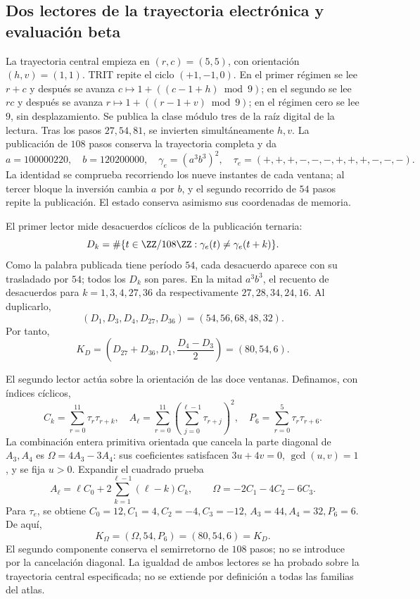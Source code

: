 \subsection{Dos lectores de la trayectoria electrónica y evaluación beta}
\label{vi:dep:beta}

La trayectoria central empieza en \((r,c)=(5,5)\), con
orientación \((h,v)=(1,1)\). TRIT repite el ciclo \((+1,-1,0)\).
En el primer régimen se lee \(r+c\) y después se avanza
\(c\mapsto1+((c-1+h)\bmod9)\); en el segundo se lee \(rc\) y
después se avanza \(r\mapsto1+((r-1+v)\bmod9)\); en el régimen
cero se lee \(9\), sin desplazamiento. Se publica la clase módulo
tres de la raíz digital de la lectura. Tras los pasos \(27,54,81\),
se invierten simultáneamente \(h,v\). La publicación de \(108\)
pasos conserva la trayectoria completa y da
\begin{equation}
 a=100000220,\quad b=120200000,\quad
 \gamma_e=(a^3b^3)^2,
 \quad\tau_e=(+,+,+,-,-,-,+,+,+,-,-,-).
 \label{vi:dep:trayectoria-electron}
\end{equation}
La identidad se comprueba recorriendo los nueve instantes de cada
ventana; al tercer bloque la inversión cambia \(a\) por \(b\),
y el segundo recorrido de \(54\) pasos repite la publicación.
El estado conserva asimismo sus coordenadas de memoria.

El primer lector mide desacuerdos cíclicos de la publicación ternaria:
\[
 D_k=\#\{t\in\ZZ/108\ZZ:\gamma_e(t)\ne\gamma_e(t+k)\}.
\]
Como la palabra publicada tiene período \(54\), cada desacuerdo
aparece con su trasladado por \(54\); todos los \(D_k\) son pares.
En la mitad \(a^3b^3\), el recuento de desacuerdos para
\(k=1,3,4,27,36\) da respectivamente \(27,28,34,24,16\).
Al duplicarlo,
\[
 (D_1,D_3,D_4,D_{27},D_{36})=(54,56,68,48,32).
\]
Por tanto,
\begin{equation}
 K_D=\left(D_{27}+D_{36},D_1,\frac{D_4-D_3}{2}\right)
     =(80,54,6).
 \label{vi:dep:KD}
\end{equation}

El segundo lector actúa sobre la orientación de las doce ventanas.
Definamos, con índices cíclicos,
\[
 C_k=\sum_{r=0}^{11}\tau_r\tau_{r+k},\quad
 A_\ell=\sum_{r=0}^{11}\left(\sum_{j=0}^{\ell-1}\tau_{r+j}\right)^2,
 \quad P_6=\sum_{r=0}^{5}\tau_r\tau_{r+6}.
\]
La combinación entera primitiva orientada que cancela la parte diagonal
de \(A_3,A_4\) es \(\Omega=4A_3-3A_4\): sus coeficientes
satisfacen \(3u+4v=0\), \(\gcd(u,v)=1\), y se fija \(u>0\).
Expandir el cuadrado prueba
\[
 A_\ell=\ell C_0+
     2\sum_{k=1}^{\ell-1}(\ell-k)C_k,
 \qquad\Omega=-2C_1-4C_2-6C_3.
\]
Para \(\tau_e\), se obtiene
\(C_0=12,C_1=4,C_2=-4,C_3=-12\),
\(A_3=44,A_4=32,P_6=6\). De aquí,
\begin{equation}
 K_\Omega=(\Omega,54,P_6)=(80,54,6)=K_D.
 \label{vi:dep:KOmega}
\end{equation}
El segundo componente conserva el semirretorno de \(108\) pasos;
no se introduce por la cancelación diagonal. La igualdad de ambos
lectores se ha probado sobre la trayectoria central especificada;
no se extiende por definición a todas las familias del atlas.


